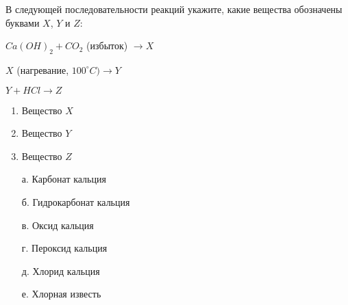 
В следующей последовательности реакций укажите, какие вещества
обозначены буквами $X$, $Y$ и $Z$:

$Ca(OH)_2 + CO_2$ (избыток) $\rightarrow X$

$X$ (нагревание, $100^{\circ}C) \rightarrow Y$

$Y + HCl \rightarrow Z$

        \begin{enumerate}
            \item Вещество $X$
            \item Вещество $Y$
            \item Вещество $Z$
        \end{enumerate}

        \begin{enumerate}
            \item[а.] Карбонат кальция
            \item[б.] Гидрокарбонат кальция
            \item[в.] Оксид кальция
            \item[г.] Пероксид кальция
            \item[д.] Хлорид кальция
            \item[е.] Хлорная известь  
        \end{enumerate}



